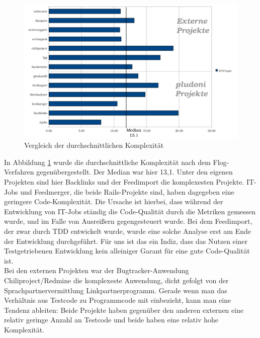 \begin{figure}[htbp]
 \centering
 \includegraphics[width=\linewidth]{./diagrams/cmp-complex.pdf}
 \caption{Vergleich der durchschnittlichen Komplexität}
 \label{fig:cpm-complex}
\end{figure}
In Abbildung \ref{fig:cpm-complex} wurde die durchschnittliche Komplexität nach dem Flog-Verfahren gegenübergestellt. Der Median war hier 13,1. Unter den eigenen Projekten sind hier Backlinks und der Feedimport die komplexesten Projekte. IT-Jobs und Feedmerger, die beide Rails-Projekte sind, haben dagegeben eine geringere Code-Komplexität. Die Ursache ist hierbei, dass während der Entwicklung von IT-Jobs ständig die Code-Qualität durch die Metriken gemessen wurde, und im Falle von Ausreißern gegengesteuert wurde. Bei dem Feedimport, der zwar durch TDD entwickelt wurde, wurde eine solche Analyse erst am Ende der Entwicklung durchgeführt. Für uns ist das ein Indiz, dass das Nutzen einer Testgetriebenen Entwicklung kein alleiniger Garant für eine gute Code-Qualität ist.\\
Bei den externen Projekten war der Bugtracker-Anwendung Chiliproject/Redmine die komplexeste Anwendung, dicht gefolgt von der Sprachpartnervermittlung Linkpartnerprogramm. Gerade wenn man das Verhältnis aus Testcode zu Programmcode mit einbezieht, kann man eine Tendenz ableiten: Beide Projekte haben gegenüber den anderen externen eine relativ geringe Anzahl an Testcode und beide haben eine relativ hohe Komplexität.

